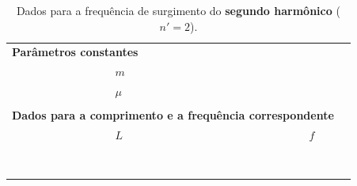 \begin{table}[!htb]
\caption{Dados para a frequência de surgimento do \textbf{segundo harmônico} ($n' = 2$).}
\label{Tab:FrequenciaFuncaoComprimento2}
	\begin{center}
		\begin{tabular}{cp{45mm}p{45mm}c}
		\toprule
\multicolumn{2}{l}{\textbf{Parâmetros constantes}}&\\
		\cmidrule{2-3}
		& \cellcolor[gray]{0.89}$m$ &\cellcolor[gray]{0.92} \\
		& \cellcolor[gray]{0.95}$\mu$ & \cellcolor[gray]{0.97}\\
		\cmidrule{2-3}
		\\
\multicolumn{3}{l}{\textbf{Dados para a comprimento e a frequência correspondente}} \\
		\cmidrule{2-3}		
		& $L$ & $f$ &\\
		\cmidrule{2-3}
		& \cellcolor[gray]{0.89} & \cellcolor[gray]{0.92} \\
		& \cellcolor[gray]{0.95} & \cellcolor[gray]{0.97} \\
		& \cellcolor[gray]{0.89} & \cellcolor[gray]{0.92} \\
		& \cellcolor[gray]{0.95} & \cellcolor[gray]{0.97} \\
		& \cellcolor[gray]{0.89} & \cellcolor[gray]{0.92} \\
		& \cellcolor[gray]{0.95} & \cellcolor[gray]{0.97} \\
		& \cellcolor[gray]{0.89} & \cellcolor[gray]{0.92} \\
		& \cellcolor[gray]{0.95} & \cellcolor[gray]{0.97} \\
		\cmidrule{2-3}
		\bottomrule
		\end{tabular}
	\end{center}
\end{table}

